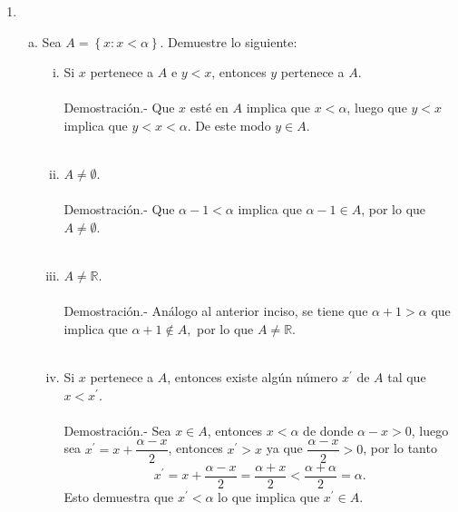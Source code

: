 \begin{enumerate}[\bfseries 1.]
    \item 
	\begin{enumerate}[(a)]

	    \item Sea $A=\left\{x:x<\alpha \right\}$. Demuestre lo siguiente:

		\begin{enumerate}[(i)]

		    \item Si $x$ pertenece a $A$ e $y<x$, entonces $y$ pertenece a $A$.\\\\
			Demostración.-\; Que $x$ esté en $A$ implica que $x<\alpha$, luego que $y<x$ implica que $y<x<\alpha$. De este modo $y \in A$.\\\\

		    \item $A\neq \emptyset$.\\\\
			Demostración.-\; Que $\alpha-1<\alpha$ implica que $\alpha-1\in A$, por lo que $A\neq \emptyset$.\\\\

		    \item $A\neq \mathbb{R}$.\\\\
			Demostración.-\; Análogo al anterior inciso, se tiene que $\alpha + 1>\alpha$ que implica que $\alpha +1 \notin A,$ por lo que $A\neq \mathbb{R}.$\\\\

		    \item Si $x$ pertenece a $A$, entonces existe algún número $x^{'}$ de $A$ tal que $x<x^{'}$.\\\\
			Demostración.-\; Sea $x\in A$, entonces $x<\alpha$ de donde $\alpha-x>0$, luego sea $x^{'}=x+\dfrac{\alpha-x}{2}$, entonces $x^{'}>x$ ya que $\dfrac{\alpha-x}{2}>0$, por lo tanto
			$$x^{'}=x+\dfrac{\alpha-x}{2}=\dfrac{\alpha+x}{2}<\dfrac{\alpha+\alpha}{2}=\alpha.$$
			Esto demuestra que $x^{'}<\alpha$ lo que implica que $x^{'}\in A.$\\\\

		\end{enumerate}


\end{enumerate}
\end{enumerate}
